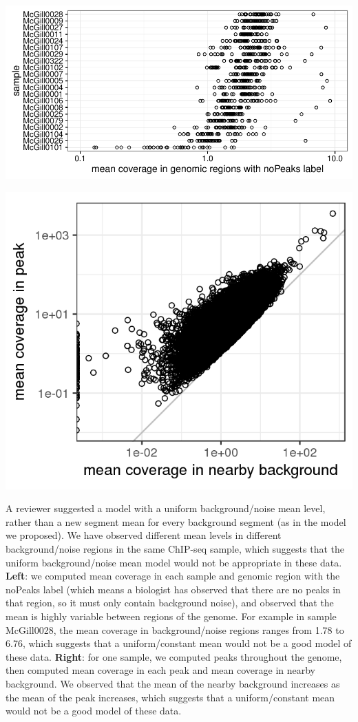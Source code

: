 \documentclass{article}
\begin{document}
\parbox{0.55\textwidth}{
\includegraphics[width=\linewidth]{figure-background}
}\parbox{0.4\textwidth}{
\includegraphics[width=\linewidth]{figure-background-peak-mean-density-scatter}
}

A reviewer suggested a model with a uniform background/noise mean
level, rather than a new segment mean for every background segment (as
in the model we proposed). We have observed different mean levels in
different background/noise regions in the same ChIP-seq sample, which
suggests that the uniform background/noise mean model would not be
appropriate in these data.  \textbf{Left}: we computed mean coverage
in each sample and genomic region with the noPeaks label (which means
a biologist has observed that there are no peaks in that region, so it
must only contain background noise), and observed that the mean is
highly variable between regions of the genome. For example in sample
McGill0028, the mean coverage in background/noise regions ranges from
1.78 to 6.76, which suggests that a uniform/constant mean would not be
a good model of these data. \textbf{Right}: for one sample, we
computed peaks throughout the genome, then computed mean coverage in
each peak and mean coverage in nearby background. We observed that the
mean of the nearby background increases as the mean of the peak
increases, which suggests that a uniform/constant mean would not be a
good model of these data.
\end{document}
